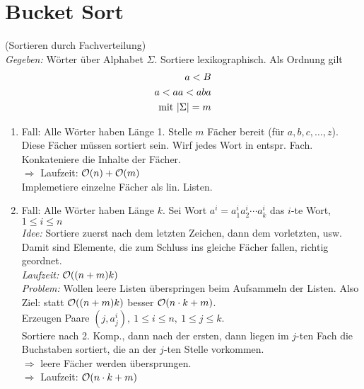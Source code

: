     \section{Bucket Sort}
        (Sortieren durch Fachverteilung)\\
        \emph{Gegeben:} Wörter über Alphabet $\Sigma$. Sortiere lexikographisch. Als Ordnung gilt
        \begin{align*}
            a < B \\
            a < aa < aba \\ 
            \text{mit } \lvert\Sigma\rvert=m
        \end{align*}
        \begin{enumerate}
            \item Fall: Alle Wörter haben Länge 1. Stelle $m$ Fächer bereit (für $a,b,c, \ldots, z$). Diese Fächer müssen sortiert sein.
            Wirf jedes Wort in entspr. Fach. Konkateniere die Inhalte der Fächer.\\
            $\Rightarrow$ Laufzeit: $\mathcal{O}(n) + \mathcal{O}(m)$\\
            Implemetiere einzelne Fächer als lin. Listen.\\
            
            \item Fall: Alle Wörter haben Länge $k$. Sei Wort $a^{i} = a_{1}^{i} a_{2}^{i} \cdots a_{k}^{i}$ 
            das $i$-te Wort, $1 \leq i \leq n$\\
            \emph{Idee:} Sortiere zuerst nach dem letzten Zeichen, dann dem vorletzten, usw. Damit sind Elemente, die zum 
            Schluss ins gleiche Fächer fallen, richtig geordnet.\\
            \emph{Laufzeit:} $\mathcal{O}((n+m)k)$\\
            \emph{Problem:} Wollen leere Listen überspringen beim Aufsammeln der Listen. Also Ziel: statt 
            $\mathcal{O}((n+m)k)$ besser $\mathcal{O}(n\cdot k + m)$.\\
            Erzeugen Paare $\left( j, a^{i}_{j} \right),~1 \leq i \leq n,~1 \leq j \leq k$.\\
            Sortiere nach 2. Komp., dann nach der ersten, dann liegen im $j$-ten Fach die Buchstaben sortiert, die an der 
            $j$-ten Stelle vorkommen.\\
            $\Rightarrow$ leere Fächer werden übersprungen.\\
            $\Rightarrow$ Laufzeit: $\mathcal{O}(n \cdot k + m)$\\
            

\end{enumerate}
